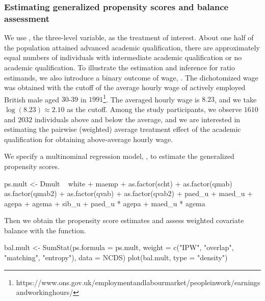 \subsubsection{Estimating generalized propensity scores and balance assessment}

We use , the three-level variable, as the treatment of interest. About one half of the population attained advanced academic qualification, there are approximately equal numbers of individuals with intermediate academic qualification or no academic qualification. To illustrate the estimation and inference for ratio estimands, we also introduce a binary outcome of wage, . The dichotomized wage was obtained with the cutoff of the average hourly wage of actively employed British male aged $30$-$39$ in $1991$\footnote{https://www.ons.gov.uk/employmentandlabourmarket/peopleinwork/earningsandworkinghours/}. The averaged hourly wage is $8.23$, and we take $\log(8.23)\approx 2.10$ as the cutoff. Among the study participants, we observe $1610$ and $2032$ individuals above and below the average, and we are interested in estimating the pairwise (weighted) average treatment effect of the academic qualification for obtaining above-average hourly wage.

We specify a multinominal regression model, , to estimate the generalized propensity scores.
 

\begin{example}
ps.mult <- Dmult ~ white + maemp + as.factor(scht) + as.factor(qmab)
    as.factor(qmab2) + as.factor(qvab) + as.factor(qvab2) + paed_u + maed_u + 
    agepa + agema + sib_u + paed_u * agepa + maed_u * agema
\end{example}
Then we obtain the propensity score estimates and assess weighted covariate balance with the  function. 

\begin{example}
bal.mult <-  SumStat(ps.formula = ps.mult,  
    weight = c("IPW", "overlap", "matching", "entropy"), data = NCDS)
plot(bal.mult, type = "density")
\end{example}

